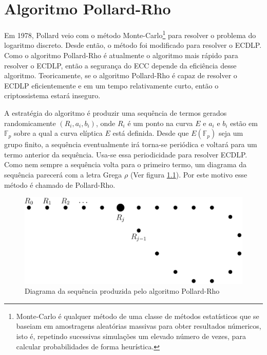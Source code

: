 \chapter{Algoritmo Pollard-Rho}
Em 1978, Pollard veio com o método Monte-Carlo\footnote{Monte-Carlo é qualquer método de uma classe de métodos estatísticos que se baseiam em amostragens aleatórias massivas para obter resultados númericos, isto é, repetindo sucessivas simulações um elevado número de vezes, para calcular probabilidades de forma heurística.} para resolver o problema do logaritmo discreto. Desde então, o método foi modificado para resolver o ECDLP. Como o algoritmo Pollard-Rho é atualmente o algoritmo mais rápido para resolver o ECDLP, então a segurança do ECC depende da eficiência desse algoritmo. Teoricamente, se o algoritmo Pollard-Rho é capaz de resolver o ECDLP eficientemente e em um tempo relativamente curto, então o criptossistema estará inseguro. \cite{Mandy:2007}

A estratégia do algoritmo é produzir uma sequência de termos gerados randomicamente $(R_i, a_i, b_i)$, onde \(R_i\) é um ponto na curva \(E\) e \(a_i\)  e \(b_i\) estão em $\mathbb{F}_p$ sobre a qual a curva elíptica \(E\) está definida. Desde que $E(\mathbb{F}_p)$ seja um grupo finito, a sequência eventualmente irá torna-se periódica e voltará para um termo anterior da sequência. Usa-se essa periodicidade para resolver ECDLP. Como nem sempre a sequência volta para o primeiro termo, um diagrama da sequência parecerá com a letra Grega \(\rho\) (Ver figura \ref{fig:rho}). Por este motivo esse método é chamado de Pollard-Rho.

\begin{figure}[h]
\centering
\includegraphics[scale=0.4, bb=0 0 888 376]{figuras/rho.eps}
\caption{Diagrama da sequência produzida pelo algoritmo Pollard-Rho}
\label{fig:rho}
\end{figure}
